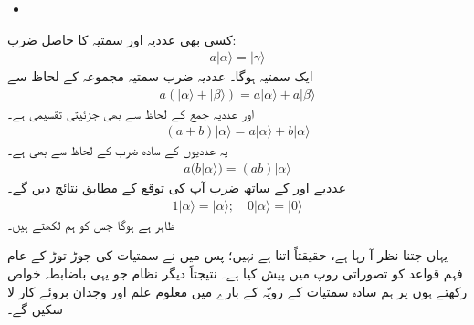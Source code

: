 \begin{itemize}
	\item {}
\end{itemize}
کسی بھی عددیہ اور سمتیہ کا حاصل ضرب:
\begin{align}
	a|\alpha\rangle=|\gamma\rangle
\end{align}
 ایک سمتیہ ہوگا۔ عددیہ ضرب سمتیہ مجموعہ کے لحاظ سے   
\begin{align}
	a(|\alpha\rangle+|\beta\rangle)=a|\alpha\rangle+a|\beta\rangle
\end{align}
اور  عددیہ جمع کے لحاظ سے بھی جزئیتی تقسیمی ہے۔
\begin{align}
	(a+b)|\alpha\rangle=a|\alpha\rangle+b|\alpha\rangle
\end{align}
یہ عددیوں کے سادہ ضرب کے لحاظ سے  بھی ہے۔
\begin{align}
	a(b|\alpha\rangle)=(ab)|\alpha\rangle
\end{align}
عددیے  اور  کے ساتھ  ضرب آپ کی  توقع کے مطابق نتائج دیں گے۔
\begin{align}
1|\alpha\rangle=|\alpha\rangle; \quad  0|\alpha\rangle=|0\rangle
\end{align}
ظاہر ہے  ہوگا جس کو ہم    لکھتے ہیں۔

یہاں   جتنا  نظر آ رہا ہے،    حقیقتاً  اتنا ہے نہیں؛   پس میں نے سمتیات کی جوڑ توڑ کے عام فہم قواعد کو تصوراتی روپ  میں پیش کیا ہے۔ نتیجتاً دیگر نظام جو یہی باضابطہ خواص رکھتے ہوں پر ہم سادہ سمتیات کے رویّہ کے بارے میں  معلوم علم  اور وجدان بروئے کار  لا سکیں گے۔

